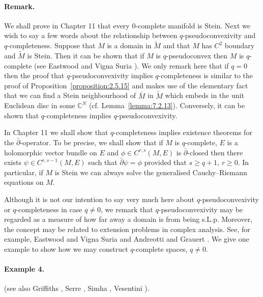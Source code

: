 \paragraph{Remark.} We shall prove in Chapter 11 that every 0-complete manifold is Stein.
Next we wish to say a few words about the relationship between $q$-pseudoconvexivity and $q$-completeness. Suppose that $M$ is a domain in $\widetilde M$ and that $M$ has $C^2$ boundary and $\widetilde M$ is Stein. Then it can be shown that if $M$ is $q$-pseudoconvex then $M$ is $q$-complete (see Eastwood and Vigna Suria \cite{bib:II:eastwood-m-g-and-vigna-suria-g:1}). We only remark here that if $q=0$ then the proof that $q$-pseudoconvexivity implies $q$-completeness is similar to the proof of Proposition~\ref{proposition:2.5.15} and makes use of the elementary fact that we can find a Stein neighbourhood of $\bar M$ in $\widetilde M$ which embeds in the unit Euclidean disc in some $\mathbb C^N$ (cf. Lemma~\ref{lemma:7.2.13}). Conversely, it can be shown that $q$-completeness implies $q$-pseudoconvexivity.

In Chapter 11 we shall show that $q$-completeness implies existence theorems for the $\bar\partial$-operator. To be precise, we shall show that if $M$ is $q$-complete, $E$ is a holomorphic vector bundle on $E$ and $\phi\in C^{r,s}(M,E)$ is $\bar\partial$-closed then there exists $\psi\in C^{r,s-1}(M,E)$ such that $\bar\partial\psi=\phi$ provided that $s\geq q+1$, $r\geq0$. In particular, if $M$ is Stein we can always solve the generalised Cauchy--Riemann equations on $M$.

Although it is not our intention to say very much here about $q$-pseudoconvexivity or $q$-completeness in case $q\neq0$, we remark that $q$-pseudoconvexivity may be regarded as a measure of how far away a domain is from being s.L.p. Moreover, the concept may be related to extension problems in complex analysis. See, for example, Eastwood and Vigna Suria \cite{bib:II:eastwood-m-g-and-vigna-suria-g:1} and Andreotti and Grauert \cite{bib:II:andreotti-a-and-grauert-h:1}. We give one example to show how we may construct $q$-complete spaces, $q\neq0$.
\paragraph{Example 4.} (see also Griffiths \cite[Theorem H]{bib:II:griffiths-p:1}, Serre \cite{bib:II:serre-j-p:1}, Simha \cite{bib:II:simha-r-r:1}, Vesentini \cite{bib:II:vesentini-e:1}).

